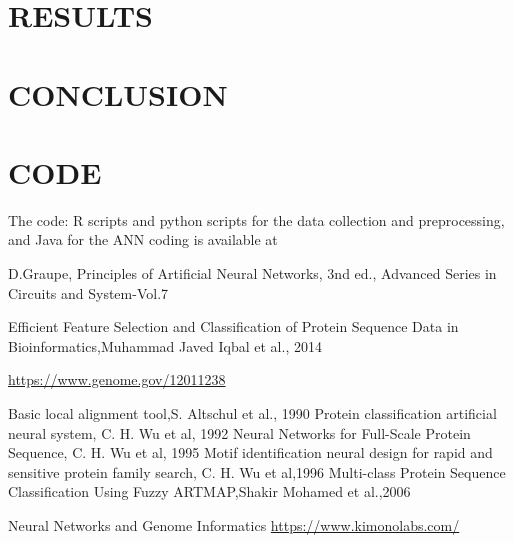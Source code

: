 \documentclass[a4paper, 10pt, conference]{ieeeconf}      %
\begin{document}
\section{RESULTS}\label{sec:results}
\section{CONCLUSION}\label{sec:conclusion}
\section{CODE}
The code: R scripts and python scripts for the data collection and preprocessing, and Java for the ANN coding is available at 


\clearpage
\newpage
\begin{thebibliography}{99}

D.Graupe, Principles of Artificial Neural Networks, 3nd ed., Advanced Series in Circuits and System-Vol.7

Efficient Feature Selection and Classification of Protein Sequence Data in Bioinformatics,Muhammad Javed Iqbal et al., 2014

\href{https://www.genome.gov/12011238}{https://www.genome.gov/12011238}

Basic local alignment tool,S. Altschul et al., 1990
Protein classification artificial neural system, C. H. Wu et al, 1992
Neural Networks for Full-Scale Protein Sequence, C. H. Wu et al, 1995
Motif identification neural design for rapid and sensitive protein family search, C. H. Wu et al,1996
Multi-class Protein Sequence Classification Using Fuzzy ARTMAP,Shakir Mohamed et al.,2006

Neural Networks and Genome Informatics
\href{https://www.kimonolabs.com/}{https://www.kimonolabs.com/}
\end{thebibliography}
\end{document}
